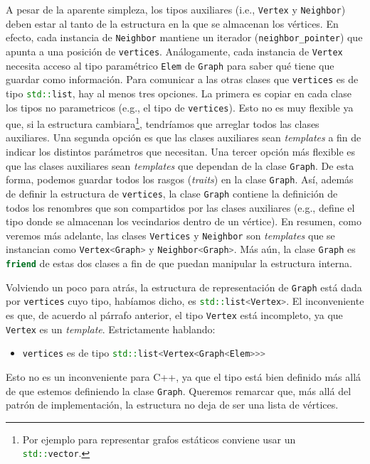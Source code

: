 \documentclass[%
    a4paper,%
    fontsize=12pt,%
    DIV=12,
    twoside,%
    openright,%
    titlepage=true,%
    headsepline,%
    toc=bibliography,%
    parskip=half,%
    cleardoublepage=empty,%
    headings=big,%
]{scrbook}
\makeatletter
\newcommand{\Code}[1]{\lstinline[basicstyle={\ttfamily}]@#1@}
\newcommand{\CPPCode}[1]{\lstinline[language=C++,basicstyle={\ttfamily}]@#1@}
\newcommand{\Graph}{\CPPCode{Graph}\xspace}
\DeclareRobustCommand{\CPP}{C\nolinebreak[4]\hspace{-.05em}\raisebox{.4ex}{\relsize{-3}\textbf{++}}\xspace}
\def\CPP{C++}%
\makeatother
\begin{document}
A pesar de la aparente simpleza, los tipos auxiliares (i.e., \CPPCode{Vertex} y \CPPCode{Neighbor}) deben estar al tanto de la estructura en la que se almacenan los vértices.  En efecto, cada instancia de \CPPCode{Neighbor} mantiene un iterador (\Code{neighbor_pointer}) que apunta a una posición de \CPPCode{vertices}.  Análogamente, cada instancia de \CPPCode{Vertex} necesita acceso al tipo paramétrico \CPPCode{Elem} de \Graph para saber qué tiene que guardar como información.  Para comunicar a las otras clases que \CPPCode{vertices} es de tipo \CPPCode{std::list}, hay al menos tres opciones.  La primera es copiar en cada clase los tipos no parametricos (e.g., el tipo de \CPPCode{vertices}).  Esto no es muy flexible ya que, si la estructura cambiara\footnote{Por ejemplo para representar grafos estáticos conviene usar un \CPPCode{std::vector}.}, tendríamos que arreglar todos las clases auxiliares.  Una segunda opción es que las clases auxiliares sean \emph{templates} a fin de indicar los distintos parámetros que necesitan.  Una tercer opción más flexible es que las clases auxiliares sean \emph{templates} que dependan de la clase \CPPCode{Graph}.  De esta forma, podemos guardar todos los rasgos (\emph{traits}) en la clase \Graph.  Así, además de definir la estructura de \CPPCode{vertices}, la clase \CPPCode{Graph} contiene la definición de todos los renombres que son compartidos por las clases auxiliares (e.g., define el tipo donde se almacenan los vecindarios dentro de un vértice). En resumen, como veremos más adelante, las clases \CPPCode{Vertices} y \CPPCode{Neighbor} son \emph{templates} que se instancian como \CPPCode{Vertex<Graph>} y \CPPCode{Neighbor<Graph>}.  Más aún, la clase \Graph es \CPPCode{friend} de estas dos clases a fin de que puedan manipular la estructura interna. 

Volviendo un poco para atrás, la estructura de representación de \Graph está dada por \CPPCode{vertices} cuyo tipo, habíamos dicho, es \CPPCode{std::list<Vertex>}.  El inconveniente es que, de acuerdo al párrafo anterior, el tipo \CPPCode{Vertex} está incompleto, ya que \CPPCode{Vertex} es un \emph{template}.  Estrictamente hablando:
\begin{itemize}
  \item \CPPCode{vertices} es de tipo \CPPCode{std::list<Vertex<Graph<Elem>>>}
\end{itemize}
Esto no es un inconveniente para \CPP, ya que el tipo está bien definido más allá de que estemos definiendo la clase \Graph.  Queremos remarcar que, más allá del patrón de implementación, la estructura no deja de ser una lista de vértices.
\end{document}
